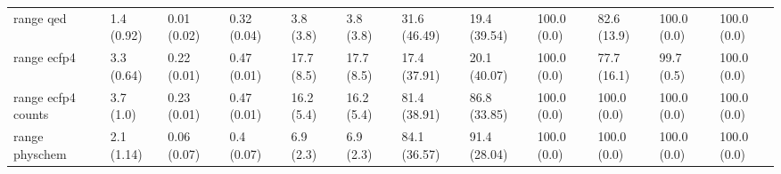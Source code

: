 \begin{tabular}{llllllllllll}
range qed & {\cellcolor[HTML]{F5FBFD}} \color[HTML]{000000} 1.4 (0.92) & {\cellcolor[HTML]{F7FCFD}} \color[HTML]{000000} 0.01 (0.02) & {\cellcolor[HTML]{6AC4A7}} \color[HTML]{000000} 0.32 (0.04) & {\cellcolor[HTML]{ECF8FB}} \color[HTML]{000000} 3.8 (3.8) & {\cellcolor[HTML]{ECF8FB}} \color[HTML]{000000} 3.8 (3.8) & {\cellcolor[HTML]{B2E2D7}} \color[HTML]{000000} 31.6 (46.49) & {\cellcolor[HTML]{D8F0EF}} \color[HTML]{000000} 19.4 (39.54) & {\cellcolor[HTML]{00441B}} \color[HTML]{F1F1F1} 100.0 (0.0) & {\cellcolor[HTML]{0D7836}} \color[HTML]{F1F1F1} 82.6 (13.9) & {\cellcolor[HTML]{00441B}} \color[HTML]{F1F1F1} 100.0 (0.0) & {\cellcolor[HTML]{00441B}} \color[HTML]{F1F1F1} 100.0 (0.0) \\
range ecfp4 & {\cellcolor[HTML]{F2FAFC}} \color[HTML]{000000} 3.3 (0.64) & {\cellcolor[HTML]{F7FCFD}} \color[HTML]{000000} 0.22 (0.01) & {\cellcolor[HTML]{6FC6AA}} \color[HTML]{000000} 0.47 (0.01) & {\cellcolor[HTML]{F7FCFD}} \color[HTML]{000000} 17.7 (8.5) & {\cellcolor[HTML]{F7FCFD}} \color[HTML]{000000} 17.7 (8.5) & {\cellcolor[HTML]{DBF2F2}} \color[HTML]{000000} 17.4 (37.91) & {\cellcolor[HTML]{D6F0EE}} \color[HTML]{000000} 20.1 (40.07) & {\cellcolor[HTML]{00441B}} \color[HTML]{F1F1F1} 100.0 (0.0) & {\cellcolor[HTML]{00451C}} \color[HTML]{F1F1F1} 77.7 (16.1) & {\cellcolor[HTML]{00441B}} \color[HTML]{F1F1F1} 99.7 (0.5) & {\cellcolor[HTML]{00441B}} \color[HTML]{F1F1F1} 100.0 (0.0) \\
range ecfp4 counts & {\cellcolor[HTML]{F2FAFC}} \color[HTML]{000000} 3.7 (1.0) & {\cellcolor[HTML]{F7FCFD}} \color[HTML]{000000} 0.23 (0.01) & {\cellcolor[HTML]{6DC5A9}} \color[HTML]{000000} 0.47 (0.01) & {\cellcolor[HTML]{F7FCFD}} \color[HTML]{000000} 16.2 (5.4) & {\cellcolor[HTML]{F7FCFD}} \color[HTML]{000000} 16.2 (5.4) & {\cellcolor[HTML]{117B38}} \color[HTML]{F1F1F1} 81.4 (38.91) & {\cellcolor[HTML]{016E2D}} \color[HTML]{F1F1F1} 86.8 (33.85) & {\cellcolor[HTML]{00441B}} \color[HTML]{F1F1F1} 100.0 (0.0) & {\cellcolor[HTML]{00441B}} \color[HTML]{F1F1F1} 100.0 (0.0) & {\cellcolor[HTML]{00441B}} \color[HTML]{F1F1F1} 100.0 (0.0) & {\cellcolor[HTML]{00441B}} \color[HTML]{F1F1F1} 100.0 (0.0) \\
range physchem & {\cellcolor[HTML]{F4FBFC}} \color[HTML]{000000} 2.1 (1.14) & {\cellcolor[HTML]{F7FCFD}} \color[HTML]{000000} 0.06 (0.07) & {\cellcolor[HTML]{5CBD98}} \color[HTML]{F1F1F1} 0.4 (0.07) & {\cellcolor[HTML]{F7FCFD}} \color[HTML]{000000} 6.9 (2.3) & {\cellcolor[HTML]{F7FCFD}} \color[HTML]{000000} 6.9 (2.3) & {\cellcolor[HTML]{097532}} \color[HTML]{F1F1F1} 84.1 (36.57) & {\cellcolor[HTML]{006027}} \color[HTML]{F1F1F1} 91.4 (28.04) & {\cellcolor[HTML]{00441B}} \color[HTML]{F1F1F1} 100.0 (0.0) & {\cellcolor[HTML]{00441B}} \color[HTML]{F1F1F1} 100.0 (0.0) & {\cellcolor[HTML]{00441B}} \color[HTML]{F1F1F1} 100.0 (0.0) & {\cellcolor[HTML]{00441B}} \color[HTML]{F1F1F1} 100.0 (0.0) \\

\end{tabular}
